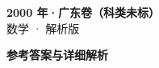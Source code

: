\documentclass[zihao=-4, a4paper]{ctexart}
\begin{document}
\begin{center}
  {\Large\bfseries 2000 年·广东卷（科类未标）}\\[4pt]
  {\large 数学 · 解析版}
\end{center}
\medskip
{}

\clearpage
{}
\begin{center}{\Large\bfseries 参考答案与详细解析}\end{center}
\medskip

\end{document}
